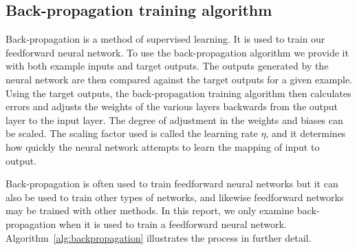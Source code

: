 \documentclass[11pt]{article}
\begin{document}

\subsection{Back-propagation training algorithm} %
\label{sub:backpropagation_training_algorithm}

Back-propagation is a method of supervised learning. It is used to train our feedforward neural network. To use the back-propagation
algorithm we provide it with both example inputs and target outputs. The outputs generated by the neural network are then compared
against the target outputs for a given example. Using the target outputs, the back-propagation training algorithm then calculates
errors and adjusts the weights of the various layers backwards from the output layer to the input layer. The degree of adjustment in the
weights and biases can be scaled. The scaling factor used is called the learning rate $\eta$, and it determines how quickly the neural
network attempts to learn the mapping of input to output.

Back-propagation is often used to train feedforward neural networks but it can also be used to train other types of networks, and
likewise feedforward networks may be trained with other methods. In this report, we only examine back-propagation when it is used to
train a feedforward neural network. Algorithm~\ref{alg:backpropagation} illustrates the process in further detail.
\end{document}
